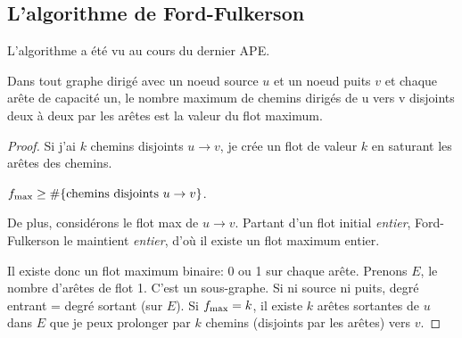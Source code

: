 \subsection{L'algorithme de Ford-Fulkerson}
\begin{myalgo}
  L'algorithme a été vu au cours du dernier APE.
\end{myalgo}


\begin{mylem}
  \label{lem:flot_chemin}
  Dans tout graphe dirigé avec un noeud source $u$ et un noeud puits $v$ et chaque arête de capacité un, le nombre maximum de chemins dirigés de u vers v disjoints deux à deux par les arêtes est la valeur du flot maximum.
  \begin{proof}
    Si j'ai $k$ chemins disjoints $u \to v$,
    je crée un flot de valeur $k$ en saturant les arêtes
    des chemins.
    \begin{figure}[h!]
      \centering
    \end{figure}
    $f_\mathrm{max} \geq \#\{\text{chemins disjoints }u \to v\}$.

    De plus, considérons le flot max de $u \to v$.
    Partant d'un flot initial \emph{entier},
    Ford-Fulkerson le maintient \emph{entier},
    d'où il existe un flot maximum entier.

    Il existe donc un flot maximum binaire: 0 ou 1
    sur chaque arête.
    Prenons $E$, le nombre d'arêtes de flot 1.
    C'est un sous-graphe.
    Si ni source ni puits,
    degré entrant = degré sortant (sur $E$).
    Si $f_\mathrm{max} = k$,
    il existe $k$ arêtes sortantes de $u$ dans $E$ que
    je peux prolonger par $k$ chemins (disjoints par les arêtes)
    vers $v$.


\end{proof}
\end{mylem}

